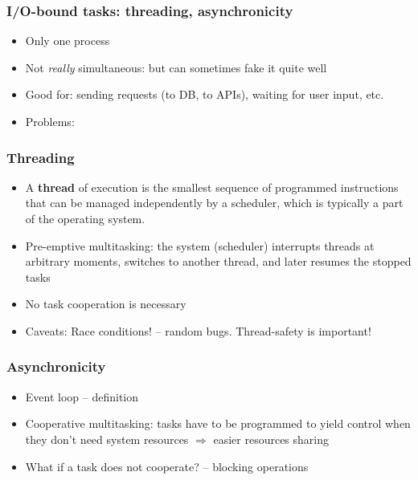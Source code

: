 \documentclass{beamer}
\begin{document}
    \begin{frame}
        \frametitle{I/O-bound tasks: threading, asynchronicity}

        \begin{itemize}
            \item Only one process
            \item Not \emph{really} simultaneous: but can sometimes fake it quite well
            \item Good for: sending requests (to DB, to APIs), waiting for user input, etc.
            \item Problems:
        \end{itemize}

    \end{frame}


    \begin{frame}
        \frametitle{Threading}

        \begin{itemize}
            \item A \textbf{thread} of execution is the smallest sequence of programmed
            instructions that can be managed independently by a scheduler, which is typically a part of the operating system.
            \item Pre-emptive multitasking: the system (scheduler) interrupts threads at arbitrary moments,
            switches to another thread, and later resumes the stopped tasks
            \item No task cooperation is necessary
            \item Caveats: Race conditions! -- random bugs. Thread-safety is important!
        \end{itemize}

    \end{frame}


    \begin{frame}
        \frametitle{Asynchronicity}

        \begin{itemize}
            \item Event loop -- definition
            \item Cooperative multitasking: tasks have to be programmed to yield control when
            they don't need system resources $\Rightarrow$ easier resources sharing
            \item What if a task does not cooperate? -- blocking operations
        \end{itemize}

    \end{frame}
\end{document}
